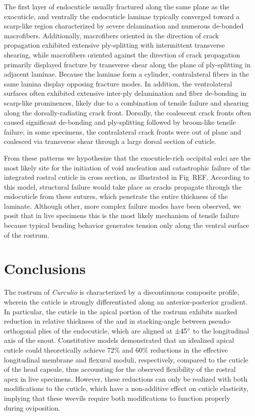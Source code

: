 \documentclass[twocolumn, linenumbers, superscriptaddress]{revtex4-1}
\begin{document}
		The first layer of endocuticle usually fractured along the same plane as the exocuticle, and ventrally the endocuticle laminae typically converged toward a scarp-like region characterized by severe delamination and numerous de-bonded macrofibers.
		Additionally, macrofibers oriented in the direction of crack propagation exhibited extensive ply-splitting with intermittent transverse shearing, while macrofibers oriented against the direction of crack propagation primarily displayed fracture by transverse shear along the plane of ply-splitting in adjacent laminae.
		Because the laminae form a cylinder, contralateral fibers in the same lamina display opposing fracture modes.
		In addition, the ventrolateral surfaces often exhibited extensive inter-ply delamination and fiber de-bonding in scarp-like prominences, likely due to a combination of tensile failure and shearing along the dorsally-radiating crack front.
		Dorsally, the coalescent crack fronts often caused significant de-bonding and ply-splitting followed by broom-like tensile failure; in some specimens, the contralateral crack fronts were out of plane and coalesced via transverse shear through a large dorsal section of cuticle.
		
		From these patterns we hypothesize that the exocuticle-rich occipital sulci are the most likely site for the initiation of void nucleation and catastrophic failure of the integrated rostral cuticle in cross section, as illustrated in Fig~REF.
		According to this model, structural failure would take place as cracks propagate through the endocuticle from these sutures, which penetrate the entire thickness of the laminate.
		Although other, more complex failure modes have been observed, we posit that in live specimens this is the most likely mechanism of tensile failure because typical bending behavior generates tension only along the ventral surface of the rostrum.

	\section{Conclusions}

		The rostrum of \textit{Curculio} is characterized by a discontinuous composite profile, wherein the cuticle is strongly differentiated along an anterior-posterior gradient.
		In particular, the cuticle in the apical portion of the rostrum exhibits marked reduction in relative thickness of the and in stacking-angle between pseudo-orthogonal plies of the endocuticle, which are aligned at $\pm45\degree$ to the longitudinal axis of the snout.
		Constitutive models demonstrated that an idealized apical cuticle could theoretically achieve 72\% and 60\% reductions in the effective longitudinal membrane and flexural moduli, respectively, compared to the cuticle of the head capsule, thus accounting for the observed flexibility of the rostral apex in live specimens.
		However, these reductions can only be realized with both modifications to the cuticle, which have a non-additive effect on cuticle elasticity, implying that these weevils require both modifications to function properly during oviposition.
		
\end{document}
